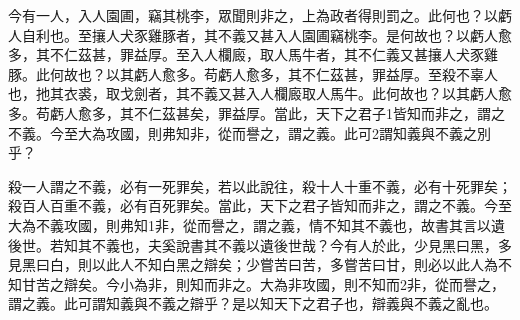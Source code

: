 
\begin{pinyinscope}
今有一人，入人園圃，竊其桃李，眾聞則非之，上為政者得則罰之。此何也？以虧人自利也。至攘人犬豕雞豚者，其不義又甚入人園圃竊桃李。是何故也？以虧人愈多，其不仁茲甚，罪益厚。至入人欄廄，取人馬牛者，其不仁義又甚攘人犬豕雞豚。此何故也？以其虧人愈多。苟虧人愈多，其不仁茲甚，罪益厚。至殺不辜人也，扡其衣裘，取戈劍者，其不義又甚入人欄廄取人馬牛。此何故也？以其虧人愈多。苟虧人愈多，其不仁茲甚矣，罪益厚。當此，天下之君子1皆知而非之，謂之不義。今至大為攻國，則弗知非，從而譽之，謂之義。此可2謂知義與不義之別乎？

殺一人謂之不義，必有一死罪矣，若以此說往，殺十人十重不義，必有十死罪矣；殺百人百重不義，必有百死罪矣。當此，天下之君子皆知而非之，謂之不義。今至大為不義攻國，則弗知1非，從而譽之，謂之義，情不知其不義也，故書其言以遺後世。若知其不義也，夫奚說書其不義以遺後世哉？今有人於此，少見黑曰黑，多見黑曰白，則以此人不知白黑之辯矣；少嘗苦曰苦，多嘗苦曰甘，則必以此人為不知甘苦之辯矣。今小為非，則知而非之。大為非攻國，則不知而2非，從而譽之，謂之義。此可謂知義與不義之辯乎？是以知天下之君子也，辯義與不義之亂也。


\end{pinyinscope}